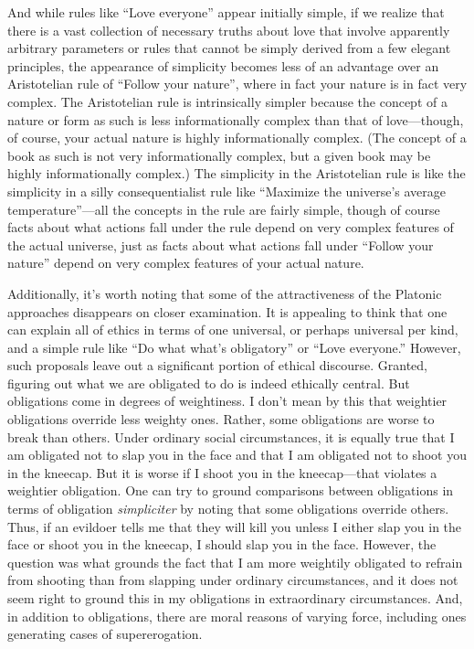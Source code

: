 And while rules like ``Love everyone'' appear initially simple, if we realize that there is a vast collection of
necessary truths about love that involve apparently arbitrary parameters or rules that cannot be 
simply derived from a few elegant principles, the appearance of simplicity becomes less of an advantage
over an Aristotelian rule of ``Follow your nature'', where in fact your nature is in fact very complex. 
The Aristotelian rule is intrinsically simpler because the concept of a nature or form as such is less 
informationally complex than that of love---though, of course, your actual nature is highly informationally 
complex. (The concept of a book as such is not very informationally complex, but a given book may be 
highly informationally complex.) The simplicity in the Aristotelian rule is like the simplicity in a silly consequentialist rule like ``Maximize the universe's average temperature''---all the concepts in the rule are 
fairly simple, though of course facts about what actions fall under the rule depend on very complex features of 
the actual universe,
just as facts about what actions fall under ``Follow your nature'' depend on very complex features of 
your actual nature.

Additionally, it's worth noting that some of the attractiveness of the Platonic approaches disappears on
closer examination. It is appealing to think that one can explain all of ethics in terms of one universal,
or perhaps universal per kind, and a simple rule like ``Do what what's obligatory'' or ``Love everyone.'' 
However, such proposals leave out a significant portion of ethical discourse. Granted, figuring out what
we are obligated to do is indeed ethically central. But obligations come in degrees of weightiness. I don't 
mean by this that weightier obligations override less weighty ones. Rather, some obligations are worse
to break than others. Under ordinary social circumstances, it is equally true that I am obligated not to slap
you in the face and that I am obligated not to shoot you in the kneecap. But it is worse if I shoot you
in the kneecap---that violates a weightier obligation. 
One can try to ground comparisons between obligations in terms of obligation \textit{simpliciter} by 
noting that some obligations override others. Thus, if an evildoer tells me that they will kill you
unless I either slap you in the face or shoot you in the kneecap, I should slap you in the face. 
However, the question was what grounds the fact that I am more weightily obligated to refrain from 
shooting than from slapping under ordinary circumstances, and it does not seem right to ground
this in my obligations in extraordinary circumstances. And, in addition to obligations, there are moral
reasons of varying force, including ones generating cases of supererogation. 

